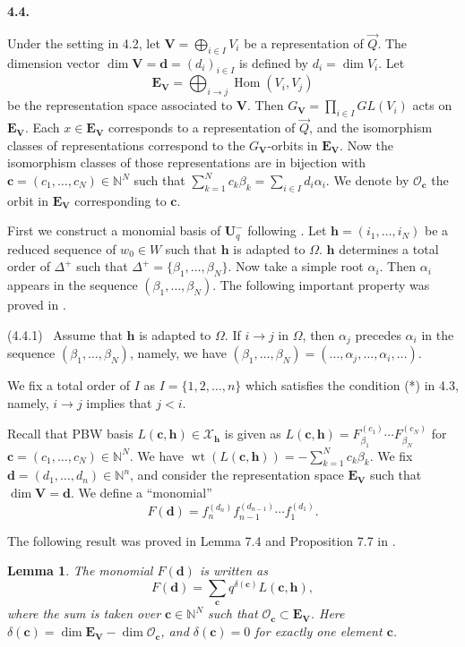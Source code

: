 \documentclass[12pt]{amsart}
\renewcommand\a{\alpha}
\renewcommand\b{\beta}
\renewcommand\d{\delta}
\newcommand\Om{\Omega}
\newcommand\vD{\varDelta}
\renewcommand{\1}{\mathbb 1}
\newcommand{\NN}{\mathbb N}
\newcommand\BE{\mathbf E}
\newcommand\BU{\mathbf U}
\newcommand\BV{\mathbf V}
\newcommand\Bh{\mathbf h}
\newcommand\Bc{\mathbf c}
\newcommand\Bd{\mathbf d}
\newcommand\SO{\mathscr{O}}
\newcommand\SX{\mathscr{X}}
\newcommand\ora{\overrightarrow}
\newcommand\Hom{\operatorname{Hom}}
\newcommand\weit{\operatorname{wt}}
\numberwithin{equation}{section}
\newtheorem{lem}[thm]{Lemma}
\def \para#1{\par\medskip\textbf{#1}
              \addtocounter{thm}{1}}
\begin{document}
\para{4.4.}
Under the setting in 4.2, 
let $\BV = \bigoplus_{i \in I}V_i$ be a representation of $\ora{Q}$.
The dimension vector $\dim \BV = \Bd = (d_i)_{i \in I}$ is defined by $d_i = \dim V_i$. 
Let
\begin{equation*}
\BE_{\BV} = \bigoplus_{i \to j}\Hom (V_i, V_j)
\end{equation*}
be the representation space associated to $\BV$.  Then $G_{\BV} = \prod_{i \in I}GL(V_i)$
acts on $\BE_{\BV}$.   Each $x \in \BE_{\BV}$ corresponds to a representation of
$\ora{Q}$, and the isomorphism classes of representations correspond to the
$G_{\BV}$-orbits in $\BE_{\BV}$.  Now the isomorphism classes of
those representations are in bijection with
$\Bc = (c_1, \dots, c_N)\in \NN^N$ such that $\sum_{k=1}^Nc_k\b_k = \sum_{i \in I}d_i\a_i$.  
We denote by $\SO_{\Bc}$ the orbit in $\BE_{\BV}$ corresponding to $\Bc$. 
\par
First we construct a monomial basis of
$\BU_q^-$ following \cite{L-can}. Let $\Bh = (i_1, \dots, i_N)$ be a reduced sequence
of $w_0 \in W$ such that $\Bh$ is adapted to $\Om$.
$\Bh$ determines a total order of $\vD^+$ such that $\vD^+ = \{ \b_1, \dots, \b_N\}$.
Now take a simple root $\a_i$.  Then $\a_i$ appears in the sequence $(\b_1, \dots, \b_N)$.
The following important property was proved in \cite [4.14 (b)]{L-can}.
\par\medskip\noindent
(4.4.1) \  Assume that $\Bh$ is adapted to $\Om$. If $i \to j$ in $\Om$,
then $\a_j$ precedes $\a_i$ in the sequence $(\b_1, \dots, \b_N)$, namely, we have
$(\b_1, \dots, \b_N) = (\dots, \a_j, \dots, \a_i, \dots)$. 
\par\medskip
We fix a total order of $I$ as $I = \{ 1, 2, \dots, n\}$ which satisfies
the condition (*)  in 4.3, namely, $i \to j$ implies that $j < i$. 
\par
Recall that PBW basis $L(\Bc, \Bh) \in \SX_{\Bh}$
is given as $L(\Bc, \Bh) = F_{\b_1}^{(c_1)}\cdots F_{\b_N}^{(c_N)}$
for $\Bc = (c_1, \dots, c_N) \in \NN^N$.  We have $\weit(L(\Bc,\Bh)) = -\sum_{k=1}^Nc_k\b_k$.  
We fix $\Bd = (d_1, \dots, d_n) \in \NN^n$, and consider the representation space
$\BE_{\BV}$ such that $\dim \BV = \Bd$. We define a ``monomial'' 
\begin{equation*}
\tag{4.4.2}  
F(\Bd) = f_n^{(d_n)}f_{n-1}^{(d_{n-1})}\cdots f_1^{(d_1)}. 
\end{equation*}

The following result was proved in Lemma 7.4 and Proposition 7.7 in \cite{L-can}.

\begin{lem}  %
The monomial $F(\Bd)$ is written as
\begin{equation*}
F(\Bd) = \sum_{\Bc}q^{\d(\Bc)}L(\Bc, \Bh),  
\end{equation*}  
where the sum is taken over $\Bc \in \NN^N$ such that
$\SO_{\Bc} \subset \BE_{\BV}$.  Here $\d(\Bc) = \dim \BE_{\BV} - \dim \SO_{\Bc}$,
and $\d(\Bc) = 0$ for exactly one element $\Bc$. 
\end{lem}
\end{document}
